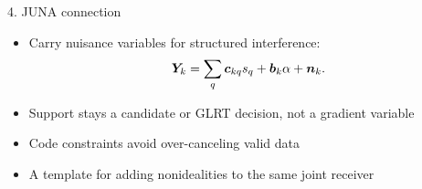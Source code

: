 \documentclass[aspectratio=169,10pt]{beamer}
\begin{document}
\begin{frame}{4. JUNA connection}
\begin{itemize}\setlength{\itemsep}{0.5em}
  \item Carry nuisance variables for structured interference:
  \[
    \bm{Y}_k=\sum_q\bm c_{kq}s_q+\bm b_k\alpha+\bm{n}_k .
  \]
  \item Support stays a candidate or GLRT decision, not a gradient variable
  \item Code constraints avoid over-canceling valid data
  \item A template for adding nonidealities to the same joint receiver
\end{itemize}
\end{frame}
\end{document}
